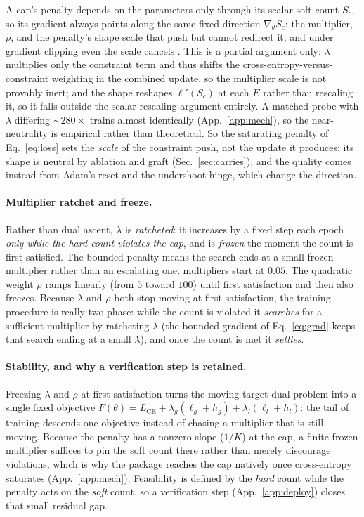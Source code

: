 \documentclass[10pt]{article}
\begin{document}
A cap's penalty depends on the parameters only through its scalar soft count
$S_c$, so its gradient always points along the same fixed direction
$\nabla_\theta S_c$: the multiplier, $\rho$, and the penalty's shape scale
that push but cannot redirect it, and under gradient clipping even the scale
cancels \citep{pascanu2013difficulty}. This is a partial argument only:
$\lambda$ multiplies only the constraint term and thus shifts the
cross-entropy-versus-constraint weighting in the combined update, so the
multiplier scale is not provably inert; and the shape reshapes $\ell'(S_c)$
at each $E$ rather than rescaling it, so it falls outside the scalar-rescaling
argument entirely. A matched probe with $\lambda$ differing ${\sim}280\times$
trains almost identically (App.~\ref{app:mech}), so the near-neutrality is
empirical rather than theoretical. So the saturating penalty of
Eq.~\eqref{eq:loss} sets the \emph{scale} of the constraint push, not the
update it produces: its shape is neutral by ablation and graft
(Sec.~\ref{sec:carries}), and the quality comes instead from Adam's reset
and the undershoot hinge, which change the direction.

\paragraph{Multiplier ratchet and freeze.}
Rather than dual ascent, $\lambda$ is \emph{ratcheted}: it increases by a
fixed step each epoch \emph{only while the hard count violates the cap}, and
is \emph{frozen} the moment the count is first satisfied. The bounded
penalty means the search ends at a small frozen multiplier rather than an
escalating one; multipliers start at $0.05$. The quadratic weight $\rho$
ramps linearly (from $5$ toward $100$) until first satisfaction and then
also freezes. Because $\lambda$ and $\rho$ both stop moving at first
satisfaction, the training procedure is really two-phase: while the count
is violated it \emph{searches} for a sufficient multiplier by ratcheting
$\lambda$ (the bounded gradient of Eq.~\eqref{eq:grad} keeps that search
ending at a small $\lambda$), and once the count is met it \emph{settles}.

\paragraph{Stability, and why a verification step is retained.}
Freezing $\lambda$ and $\rho$ at first satisfaction turns the moving-target
dual problem into a single fixed objective
$F(\theta)=L_{\text{CE}}+\lambda_g(\ell_g{+}h_g)+\lambda_l(\ell_l{+}h_l)$:
the tail of training descends one objective instead of chasing a multiplier
that is still moving. Because the penalty has a nonzero slope ($1/K$) at the
cap, a finite frozen multiplier suffices to pin the soft count there rather
than merely discourage violations, which is why the package reaches the cap
natively once cross-entropy saturates (App.~\ref{app:mech}). Feasibility is
defined by the \emph{hard} count while the penalty acts on the \emph{soft}
count, so a verification step (App.~\ref{app:deploy}) closes that small
residual gap.
\end{document}

